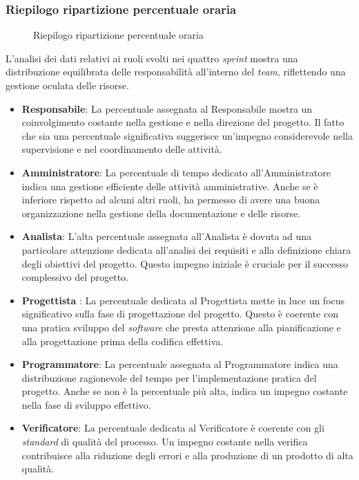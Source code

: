 \subsubsection{Riepilogo ripartizione percentuale oraria}
\begin{figure}[h]
	\centering
	\caption{Riepilogo ripartizione percentuale oraria}
\end{figure}

L'analisi dei dati relativi ai ruoli svolti nei quattro \textit{sprint} mostra una distribuzione equilibrata delle responsabilità all'interno del \textit{team}, riflettendo una gestione oculata delle risorse.
\begin{itemize}
	\item \textbf{Responsabile}: La percentuale assegnata al Responsabile mostra un coinvolgimento costante nella gestione e nella direzione del progetto. Il fatto che sia una percentuale significativa
	      suggerisce un'impegno considerevole nella supervisione e nel coordinamento delle attività.
	\item \textbf{Amministratore}: La percentuale di tempo dedicato all'Amministratore indica una gestione efficiente delle attività amministrative. Anche se è inferiore rispetto ad alcuni altri ruoli,
	      ha permesso di avere una buona organizzazione nella gestione della documentazione e delle risorse.
	\item \textbf{Analista}: L'alta percentuale assegnata all'Analista è dovuta ad una particolare attenzione dedicata all'analisi dei requisiti e alla definizione chiara degli obiettivi del progetto.
	      Questo impegno iniziale è cruciale per il successo complessivo del progetto.
	\item \textbf{Progettista} : La percentuale dedicata al Progettista mette in luce un focus significativo sulla fase di progettazione del progetto. Questo è coerente con una pratica sviluppo del \textit{software}
	      che presta attenzione alla pianificazione e alla progettazione prima della codifica effettiva.
	\item \textbf{Programmatore}: La percentuale assegnata al Programmatore indica una distribuzione ragionevole del tempo per l'implementazione pratica del progetto. Anche se non è la percentuale più alta,
	      indica un impegno costante nella fase di sviluppo effettivo.
	\item \textbf{Verificatore}: La percentuale dedicata al Verificatore è coerente con gli \textit{standard} di qualità del processo. Un impegno costante nella verifica contribuisce alla riduzione degli errori e
	      alla produzione di un prodotto di alta qualità.
\end{itemize}

